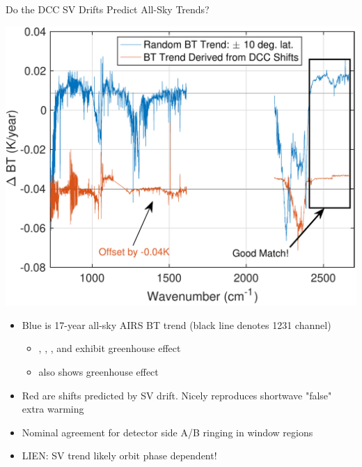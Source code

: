 \documentclass[10pt,t]{beamer}
\begin{document}
\begin{frame}[label={sec:org0628e38}]{Do the DCC SV Drifts Predict All-Sky Trends?}
\vspace{-0.1in}
\begin{center}
\includegraphics[width=0.65\linewidth]{./Figs/Pdf/random_trend_with_drift_for_that_bt_from_dcc_drifts.pdf}
\end{center}

\vspace{-0.1in}

\scriptsize
\begin{itemize}
\item Blue is 17-year all-sky AIRS BT trend (black line denotes 1231 \wn channel)
\begin{itemize}
\item \scriptsize \cd, \methane, \nitrous, and \ozone exhibit greenhouse effect
\item \scriptsize \water also shows greenhouse effect
\end{itemize}
\item Red are shifts predicted by SV drift.  Nicely reproduces shortwave "false" extra warming
\item Nominal agreement for detector side A/B ringing in window regions
\item LIEN: SV trend likely orbit phase dependent!
\end{itemize}
\end{frame}
\end{document}
